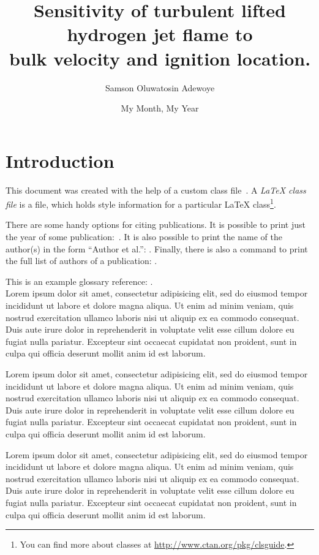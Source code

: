 \documentclass[withindex,glossary]{cam-thesis}
\title{\normalsize Sensitivity of turbulent lifted hydrogen jet flame to\\
bulk velocity and ignition location.}
\author{Samson Oluwatosin Adewoye}
\date{My Month, My Year}
\begin{document}
\frontmatter{}



\chapter{Introduction}
This document was created with the help of a custom class file~\cite{example}. A
{\em \LaTeX{} class file} is a file,
which holds style information for a particular \LaTeX{} class\footnote{You can
find more about classes at \url{http://www.ctan.org/pkg/clsguide}.}.

There are some handy options for citing publications. It is possible to print just the year of some publication:~\citeyear{example}. It is also possible to print the name of the author(s) in the form ``Author et al.'': \citeauthor{example}. Finally, there is also a command to print the full list of authors of a publication: \citet*{example}.

This is an example glossary reference: . \\
 
Lorem ipsum dolor sit amet, consectetur adipisicing elit, sed do eiusmod tempor incididunt ut labore et dolore magna aliqua. Ut enim ad minim veniam, quis nostrud exercitation ullamco laboris nisi ut aliquip ex ea commodo consequat. Duis aute irure dolor in reprehenderit in voluptate velit esse cillum dolore eu fugiat nulla pariatur. Excepteur sint occaecat cupidatat non proident, sunt in culpa qui officia deserunt mollit anim id est laborum.

Lorem ipsum dolor sit amet, consectetur adipisicing elit, sed do eiusmod tempor incididunt ut labore et dolore magna aliqua. Ut enim ad minim veniam, quis nostrud exercitation ullamco laboris nisi ut aliquip ex ea commodo consequat. Duis aute irure dolor in reprehenderit in voluptate velit esse cillum dolore eu fugiat nulla pariatur. Excepteur sint occaecat cupidatat non proident, sunt in culpa qui officia deserunt mollit anim id est laborum.

Lorem ipsum dolor sit amet, consectetur adipisicing elit, sed do eiusmod tempor incididunt ut labore et dolore magna aliqua. Ut enim ad minim veniam, quis nostrud exercitation ullamco laboris nisi ut aliquip ex ea commodo consequat. Duis aute irure dolor in reprehenderit in voluptate velit esse cillum dolore eu fugiat nulla pariatur. Excepteur sint occaecat cupidatat non proident, sunt in culpa qui officia deserunt mollit anim id est laborum.
\end{document}
